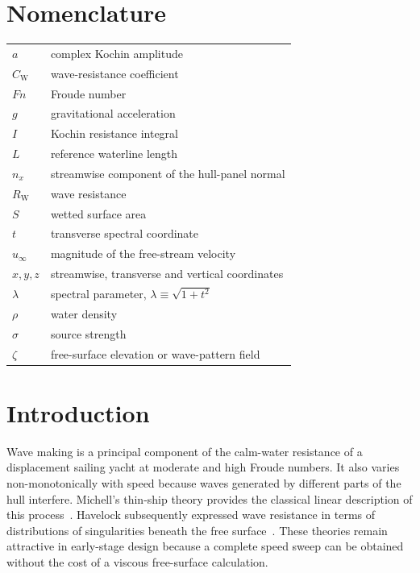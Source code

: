 \documentclass{jfm}
\begin{document}
\section*{Nomenclature}
\begin{center}
\begin{tabular}{@{}ll@{}}
$a$ & complex Kochin amplitude \\
$C_\mathrm{W}$ & wave-resistance coefficient \\
$Fn$ & Froude number \\
$g$ & gravitational acceleration \\
$I$ & Kochin resistance integral \\
$L$ & reference waterline length \\
$n_x$ & streamwise component of the hull-panel normal \\
$R_\mathrm{W}$ & wave resistance \\
$S$ & wetted surface area \\
$t$ & transverse spectral coordinate \\
$u_\infty$ & magnitude of the free-stream velocity \\
$x,y,z$ & streamwise, transverse and vertical coordinates \\
$\lambda$ & spectral parameter, $\lambda\equiv\sqrt{1+t^2}$ \\
$\rho$ & water density \\
$\sigma$ & source strength \\
$\zeta$ & free-surface elevation or wave-pattern field \\
\end{tabular}
\end{center}

\section{Introduction}\label{sec:introduction}

Wave making is a principal component of the calm-water resistance of a
displacement sailing yacht at moderate and high Froude numbers. It also varies
non-monotonically with speed because waves generated by different parts of the
hull interfere. Michell's thin-ship theory provides the classical linear
description of this process~\citep{Michell1898,Tuck1989}. Havelock subsequently
expressed wave resistance in terms of distributions of singularities beneath
the free surface~\citep{Havelock1932}. These theories remain attractive in
early-stage design because a complete speed sweep can be obtained without the
cost of a viscous free-surface calculation.
\end{document}
